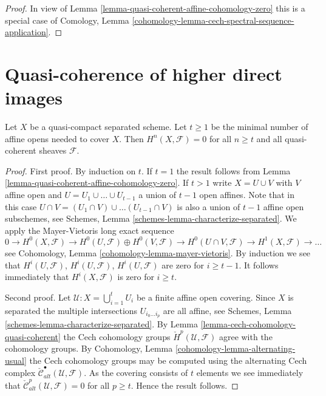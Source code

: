 \begin{proof}
In view of Lemma \ref{lemma-quasi-coherent-affine-cohomology-zero}
this is a special case of
Comology, Lemma \ref{cohomology-lemma-cech-spectral-sequence-application}.
\end{proof}















\section{Quasi-coherence of higher direct images}
\label{section-quasi-coherence}

\begin{lemma}
\label{lemma-vanishing-nr-affines}
Let $X$ be a quasi-compact separated scheme.
Let $t \geq 1$ be the minimal number of affine opens needed to
cover $X$.
Then $H^n(X, \mathcal{F}) = 0$ for all $n \geq t$ and all
quasi-coherent sheaves $\mathcal{F}$.
\end{lemma}

\begin{proof}
First proof.
By induction on $t$.
If $t = 1$ the result follows from
Lemma \ref{lemma-quasi-coherent-affine-cohomology-zero}.
If $t > 1$ write $X = U \cup V$ with $V$ affine open and
$U = U_1 \cup \ldots \cup U_{t - 1}$ a union of $t - 1$ open affines.
Note that in this case
$U \cap V =  (U_1 \cap V) \cup \ldots (U_{t - 1} \cap V)$
is also a union of $t - 1$ affine open subschemes, see
Schemes, Lemma \ref{schemes-lemma-characterize-separated}.
We apply the Mayer-Vietoris long exact sequence
$$
0 \to
H^0(X, \mathcal{F}) \to
H^0(U, \mathcal{F}) \oplus H^0(V, \mathcal{F}) \to
H^0(U \cap V, \mathcal{F}) \to
H^1(X, \mathcal{F}) \to \ldots
$$
see Cohomology, Lemma \ref{cohomology-lemma-mayer-vietoris}.
By induction we see that $H^i(U, \mathcal{F})$,
$H^i(U, \mathcal{F})$, $H^i(U, \mathcal{F})$ are zero for
$i \geq t - 1$. It follows immediately that $H^i(X, \mathcal{F})$
is zero for $i \geq t$.

\medskip\noindent
Second proof. 
Let $\mathcal{U} : X = \bigcup_{i = 1}^t U_i$ be a finite affine open
covering. Since $X$ is separated the multiple intersections
$U_{i_0 \ldots i_p}$ are all affine, see 
Schemes, Lemma \ref{schemes-lemma-characterize-separated}.
By Lemma \ref{lemma-cech-cohomology-quasi-coherent} the Cech
cohomology groups $\check{H}^p(\mathcal{U}, \mathcal{F})$
agree with the cohomology groups. By
Cohomology, Lemma \ref{cohomology-lemma-alternating-usual}
the Cech cohomology groups may be computed using the alternating
Cech complex $\check{\mathcal{C}}_{alt}^\bullet(\mathcal{U}, \mathcal{F})$.
As the covering consists of $t$ elements we see immediately
that $\check{\mathcal{C}}_{alt}^p(\mathcal{U}, \mathcal{F}) = 0$
for all $p \geq t$. Hence the result follows.
\end{proof}

